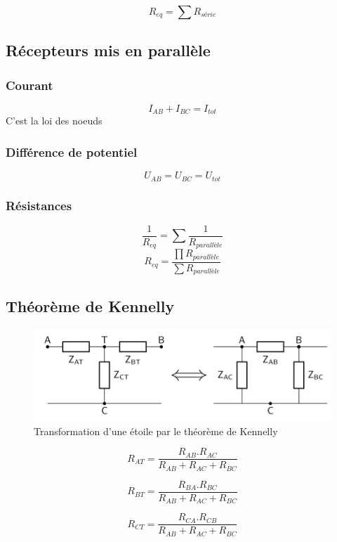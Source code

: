  \begin{equation}
	 R_{eq} = \sum R_{série}
 \end{equation}

 \subsection{Récepteurs mis en parallèle}
 \subsubsection{Courant}

 \begin{equation}
	 I_{AB} + I_{BC} = I_{tot}
 \end{equation}
 C'est la loi des noeuds

 \subsubsection{Différence de potentiel}

 \begin{equation}
	 U_{AB} = U_{BC} = U_{tot}
 \end{equation}

 \subsubsection{Résistances}

 \begin{equation}
	 \frac{1}{R_{eq}} = \sum \frac{1}{R_{parallèle}}
 \end{equation}
 \begin{equation}
	 R_{eq} = \frac{\prod R_{parallèle}}{\sum R_{parallèle}}
 \end{equation}

 \subsection{Théorème de Kennelly}

\begin{figure}[h]
	 \centering
	 \includegraphics[scale = 0.5]{kennelly}
	 \caption{Transformation d'une étoile par le théorème de Kennelly}
 \end{figure}

 \begin{equation}
	 R_{AT} = \frac{R_{AB}.R_{AC}}{R_{AB} + R_{AC}+R_{BC}}
 \end{equation}

 \begin{equation}
	 R_{BT} = \frac{R_{BA}.R_{BC}}{R_{AB} + R_{AC}+R_{BC}}
 \end{equation}

 \begin{equation}
	 R_{CT} = \frac{R_{CA}.R_{CB}}{R_{AB} + R_{AC}+R_{BC}}
 \end{equation}
